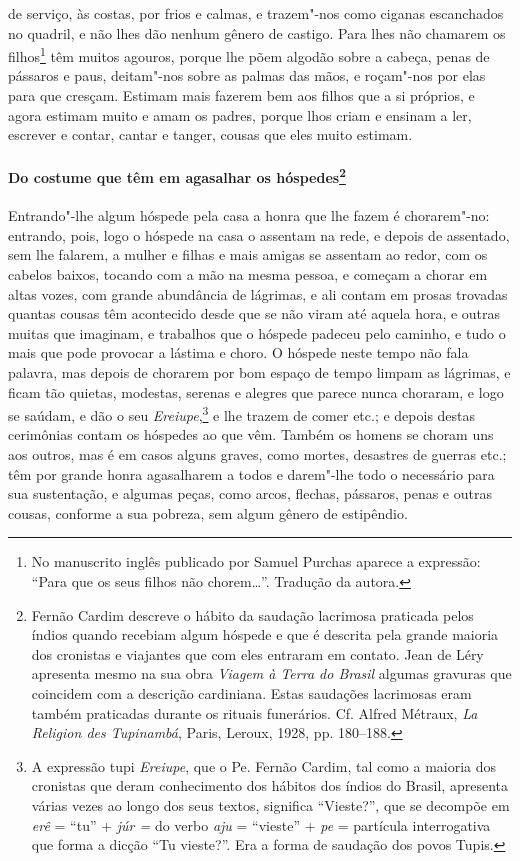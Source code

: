 de serviço, às costas, por frios e calmas, e trazem"-nos como ciganas
escanchados no quadril, e não lhes dão nenhum gênero de castigo. Para
lhes não chamarem os filhos\footnote{ No manuscrito inglês publicado
por Samuel Purchas aparece a expressão: ``Para que os seus filhos não
chorem\ldots{}''. Tradução da autora.} têm muitos agouros, porque lhe põem
algodão sobre a cabeça, penas de pássaros e paus, deitam"-nos sobre as
palmas das mãos, e roçam"-nos por elas para que cresçam. Estimam mais
fazerem bem aos filhos que a si próprios, e agora estimam muito e amam
os padres, porque lhos criam e ensinam a ler, escrever e contar, cantar
e tanger, cousas que eles muito estimam.

\paragraph[Do costume que têm em agasalhar os hóspedes]{Do costume que têm em 
agasalhar os hóspedes\protect\footnote{ Fernão Cardim descreve o hábito da
saudação lacrimosa praticada pelos índios quando recebiam algum
hóspede e que é descrita pela grande maioria dos cronistas e viajantes
que com eles entraram em contato. Jean de Léry apresenta mesmo na
sua obra \textit{Viagem à Terra do Brasil} algumas gravuras que
coincidem com a descrição cardiniana. Estas saudações lacrimosas eram
também praticadas durante os rituais funerários. Cf. Alfred Métraux,
\textit{La Religion des Tupinambá}, Paris, Leroux, 1928, pp. 180--188.}}

Entrando"-lhe algum hóspede pela casa a honra que lhe fazem é
chorarem"-no: entrando, pois, logo o hóspede na casa o assentam na rede,
e depois de assentado, sem lhe falarem, a mulher e filhas e mais
amigas se assentam ao redor, com os cabelos baixos, tocando com a mão
na mesma pessoa, e começam a chorar em altas vozes, com grande
abundância de lágrimas, e ali contam em prosas trovadas quantas cousas
têm acontecido desde que se não viram até aquela hora, e outras muitas
que imaginam, e trabalhos que o hóspede padeceu pelo caminho, e tudo o
mais que pode provocar a lástima e choro. O hóspede neste tempo não
fala palavra, mas depois de chorarem por bom espaço de tempo limpam as
lágrimas, e ficam tão quietas, modestas, serenas e alegres que parece
nunca choraram, e logo se saúdam, e dão o seu 
\textit{Ereiupe},\footnote{ A expressão tupi \textit{Ereiupe}, que o Pe. Fernão
Cardim, tal como a maioria dos cronistas que deram conhecimento dos
hábitos dos índios do Brasil, apresenta várias vezes ao longo dos seus
textos, significa ``Vieste?'', que se decompõe em \textit{erê} = ``tu'' +
\textit{júr =} do verbo \textit{aju} = ``vieste'' + \textit{pe} =
partícula interrogativa que forma a dicção ``Tu vieste?''. Era a forma
de saudação dos povos Tupis.} e lhe trazem de comer etc.; e
depois destas cerimônias contam os hóspedes ao que vêm. Também os
homens se choram uns aos outros, mas é em casos alguns graves, como
mortes, desastres de guerras etc.; têm por grande honra agasalharem a
todos e darem"-lhe todo o necessário para sua sustentação, e algumas
peças, como arcos, flechas, pássaros, penas e outras cousas, conforme a
sua pobreza, sem algum gênero de estipêndio.

